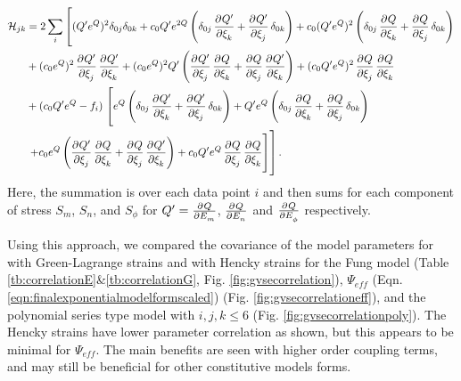 \begin{equation}	
\begin{aligned}
\mathcal{H}_{jk} &= 2\sum_i\left[ (Q^\prime e^Q)^2  \delta_{0j}\delta_{0k} + c_0Q^\prime e^{2Q} \left(\delta_{0j}\dpd{Q^\prime}{\xi_k} + \dpd{Q^\prime}{\xi_j} \delta_{0k}\right) + c_0 (Q^\prime e^Q)^2 \left(\delta_{0j}\dpd{Q}{\xi_k} + \dpd{Q}{\xi_j}\delta_{0k}\right)   \right.	\\
&+ (c_0 e^Q)^2 \dpd{Q^\prime}{\xi_j}\dpd{Q^\prime}{\xi_k} +  (c_0e^Q)^2Q^\prime \left( \dpd{Q^\prime}{\xi_j}\dpd{Q}{\xi_k}	+ \dpd{Q}{\xi_j}\dpd{Q^\prime}{\xi_k}\right) + (c_0Q^\prime e^Q)^2 \dpd{Q}{\xi_j}\dpd{Q}{\xi_k}	\\
&+ (c_0Q^\prime e^Q - f_i)\left.\left[ e^Q \left(\delta_{0j}\dpd{Q^\prime}{\xi_k} + \dpd{Q^\prime}{\xi_j}\delta_{0k}\right) + Q^\prime e^Q \left(\delta_{0j}\dpd{Q}{\xi_k}  + \dpd{Q}{\xi_j}\delta_{0k}\right)
\right.\right.	\\
&\left.\left.+ c_0 e^Q\left(\dpd{Q^\prime}{\xi_j}\dpd{Q}{\xi_k}  +  \dpd{Q}{\xi_j}\dpd{Q^\prime}{\xi_k}\right)
+ c_0Q^\prime e^Q \dpd{Q}{\xi_j}\dpd{Q}{\xi_k} \right]\right].
\end{aligned}
\end{equation}
Here, the summation is over each data point $i$ and then sums for each component of stress $S_m$, $S_n$, and $S_\phi$ for $Q^\prime = \pd{Q}{E_m}$, $\pd{Q}{E_n}$ and $\pd{Q}{E_\phi}$ respectively. 

	Using this approach, we compared the covariance of the model parameters for with Green-Lagrange strains and with Hencky strains for the Fung model (Table \ref{tb:correlationE}\&\ref{tb:correlationG}, Fig. \ref{fig:gvsecorrelation}), $\Psi_{eff}$ (Eqn. \ref{eqn:finalexponentialmodelformscaled}) (Fig. \ref{fig:gvsecorrelationeff}), and the polynomial series type model with $i,j,k \leq 6$ (Fig. \ref{fig:gvsecorrelationpoly}). The Hencky strains have lower parameter correlation as shown, but this appears to be minimal for $\Psi_{eff}$. The main benefits are seen with higher order coupling terms, and may still be beneficial for other constitutive models forms. 



